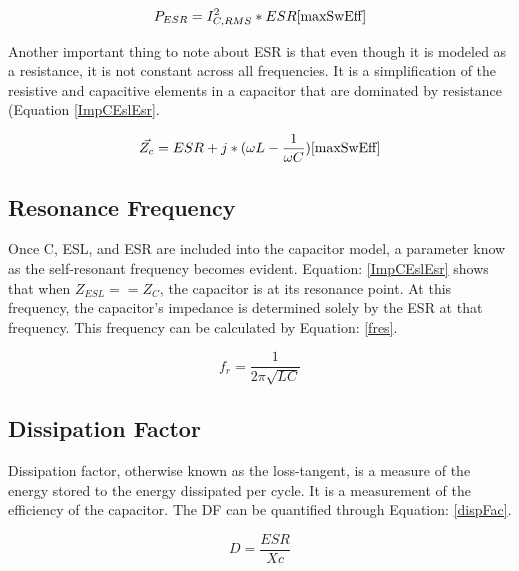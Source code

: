 \begin{equation}
\label{dcdcESReqn}
P_{ESR} = I_{C,RMS}^2 * ESR
\cite{maxSwEff}
\end{equation}

Another important thing to note about ESR is that even though it is modeled as a resistance, it is not constant across all frequencies. It is a simplification of the resistive and capacitive elements in a capacitor that are dominated by resistance (Equation \eqref{ImpCEslEsr}.

\begin{equation}
\label{ImpCEslEsr}
\vec{Z_c} = ESR + j * (\omega L - \frac{1}{\omega C})
\cite{maxSwEff}
\end{equation}


\subsection{Resonance Frequency}

Once C, ESL, and ESR are included into the capacitor model, a parameter know as the self-resonant frequency becomes evident. Equation: \eqref{ImpCEslEsr} shows that when $Z_{ESL} == Z_C$, the capacitor is at its resonance point. At this frequency, the capacitor's impedance is determined solely by the ESR at that frequency. This frequency can be calculated by Equation: \eqref{fres}.

\begin{equation}
\label{fres}
f_r = \frac{1}{2\pi \sqrt{LC}}
\end{equation}

\subsection{Dissipation Factor}

Dissipation factor, otherwise known as the loss-tangent, is a measure of the energy stored to the energy dissipated per cycle. It is a measurement of the efficiency of the capacitor. The DF can be quantified through Equation: \eqref{dispFac}. 

\begin{equation}
\label{dispFac}
D = \frac{ESR}{Xc}
\end{equation}

